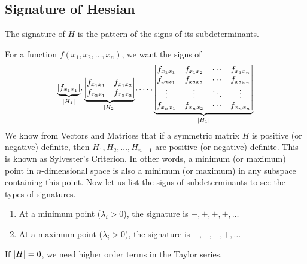 \subsection{Signature of Hessian}
\begin{definition}
	The signature of \(H\) is the pattern of the signs of its subdeterminants.
\end{definition}
For a function \(f(x_1, x_2, \dots, x_n)\), we want the signs of
\[
	\underbrace{\abs{f_{x_1x_1}}}_{\abs{H_1}}, \underbrace{\begin{vmatrix}
			f_{x_1 x_1} & f_{x_1 x_2} \\
			f_{x_2 x_1} & f_{x_2 x_2}
		\end{vmatrix}}_{\abs{H_2}},\dots, \underbrace{\begin{vmatrix}
			f_{x_1 x_1} & f_{x_1 x_2} & \cdots & f_{x_1 x_n} \\
			f_{x_2 x_1} & f_{x_2 x_2} & \cdots & f_{x_2 x_n} \\
			\vdots      & \vdots      & \ddots & \vdots      \\
			f_{x_n x_1} & f_{x_n x_2} & \cdots & f_{x_n x_n}
		\end{vmatrix}}_{\abs{H_1}}
\]
We know from Vectors and Matrices that if a symmetric matrix \(H\) is positive (or negative) definite, then \(H_1, H_2, \dots, H_{n-1}\) are positive (or negative) definite.
This is known as Sylvester's Criterion.
In other words, a minimum (or maximum) point in \(n\)-dimensional space is also a minimum (or maximum) in any subspace containing this point.
Now let us list the signs of subdeterminants to see the types of signatures.
\begin{enumerate}
	\item At a minimum point (\(\lambda_i > 0\)), the signature is \(+, +, +, +, \dots\)
	\item At a maximum point (\(\lambda_i > 0\)), the signature is \(-, +, -, +, \dots\)
\end{enumerate}
If \(\abs{H} = 0\), we need higher order terms in the Taylor series.

